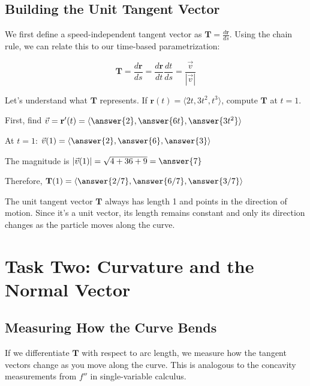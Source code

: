 \documentclass{ximera}
\begin{document}
\subsection*{Building the Unit Tangent Vector}

We first define a speed-independent tangent vector as $\mathbf{T}=\frac{d\mathbf{r}}{ds}$. Using the chain rule, we can relate this to our time-based parametrization:

\[\mathbf{T}=\frac{d\mathbf{r}}{ds}=\frac{d\mathbf{r}}{dt}\frac{dt}{ds}=\frac{\vec{v}}{|\vec{v}|}\]

\begin{problem}
Let's understand what $\mathbf{T}$ represents. If $\mathbf{r}(t) = \langle 2t, 3t^2, t^3 \rangle$, compute $\mathbf{T}$ at $t=1$.

First, find $\vec{v} = \mathbf{r}'(t) = \langle \answer{2}, \answer{6t}, \answer{3t^2} \rangle$

At $t=1$: $\vec{v}(1) = \langle \answer{2}, \answer{6}, \answer{3} \rangle$

The magnitude is $|\vec{v}(1)| = \sqrt{4 + 36 + 9} = \answer{7}$

Therefore, $\mathbf{T}(1) = \langle \answer{2/7}, \answer{6/7}, \answer{3/7} \rangle$

\begin{feedback}
The unit tangent vector $\mathbf{T}$ always has length 1 and points in the direction of motion. Since it's a unit vector, its length remains constant and only its direction changes as the particle moves along the curve.
\end{feedback}
\end{problem}

\section*{Task Two: Curvature and the Normal Vector}

\subsection*{Measuring How the Curve Bends}

If we differentiate $\mathbf{T}$ with respect to arc length, we measure how the tangent vectors change as you move along the curve. This is analogous to the concavity measurements from $f''$ in single-variable calculus.
\end{document}
